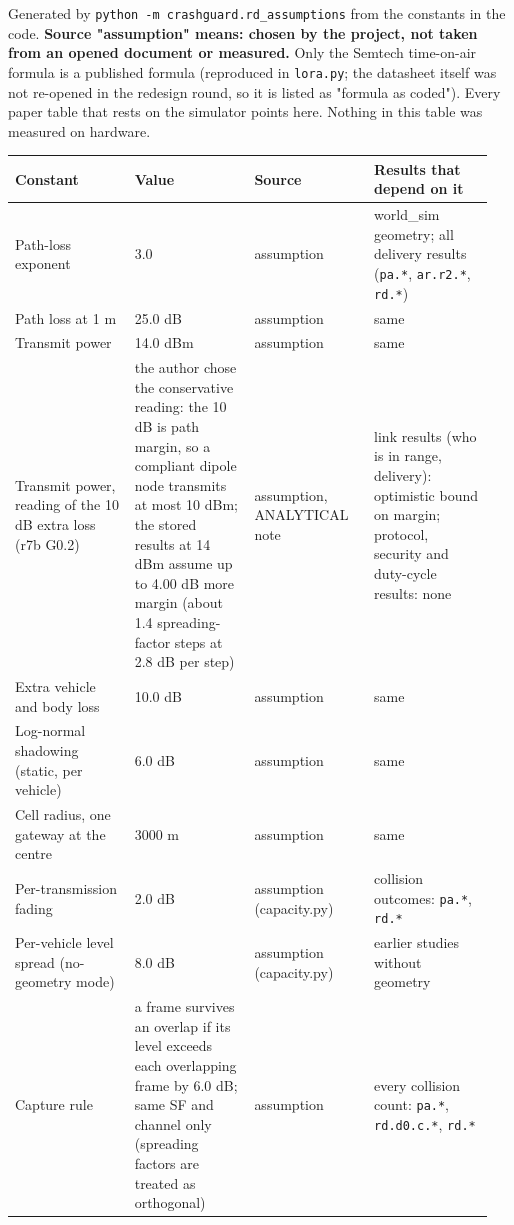 


Generated by \texttt{python -m crashguard.rd\_assumptions} from the constants in the code. \textbf{Source "assumption" means: chosen by the project, not taken from an opened document or measured.} Only the Semtech time-on-air formula is a published formula
(reproduced in \texttt{lora.py}; the datasheet itself was not re-opened in the redesign round, so it is listed as "formula as coded"). Every paper table that rests on the simulator points here. Nothing in this table was measured on hardware.

{\scriptsize\raggedright
\begin{longtable}{p{0.237\linewidth}p{0.237\linewidth}p{0.237\linewidth}p{0.237\linewidth}}
\toprule
Constant & Value & Source & Results that depend on it \\
\midrule
\endhead
Path-loss exponent & 3.0 & assumption & world\_sim geometry; all delivery results (\texttt{pa.*}, \texttt{ar.r2.*}, \texttt{rd.*}) \\
Path loss at 1 m & 25.0 dB & assumption & same \\
Transmit power & 14.0 dBm & assumption & same \\
Transmit power, reading of the 10 dB extra loss (r7b G0.2) & the author chose the conservative reading: the 10 dB is path margin, so a compliant dipole node transmits at most 10 dBm; the stored results at 14 dBm assume up to 4.00 dB more margin (about 1.4 spreading-factor steps at 2.8 dB per step) & assumption, ANALYTICAL note & link results (who is in range, delivery): optimistic bound on margin; protocol, security and duty-cycle results: none \\
Extra vehicle and body loss & 10.0 dB & assumption & same \\
Log-normal shadowing (static, per vehicle) & 6.0 dB & assumption & same \\
Cell radius, one gateway at the centre & 3000 m & assumption & same \\
Per-transmission fading & 2.0 dB & assumption (capacity.py) & collision outcomes: \texttt{pa.*}, \texttt{rd.*} \\
Per-vehicle level spread (no-geometry mode) & 8.0 dB & assumption (capacity.py) & earlier studies without geometry \\
Capture rule & a frame survives an overlap if its level exceeds each overlapping frame by 6.0 dB; same SF and channel only (spreading factors are treated as orthogonal) & assumption & every collision count: \texttt{pa.*}, \texttt{rd.d0.c.*}, \texttt{rd.*} \\

\end{longtable}}
